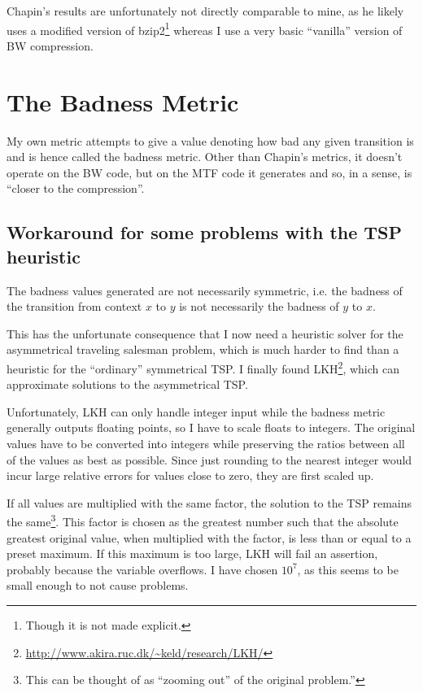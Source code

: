 \documentclass[a4paper]{scrreprt}
\begin{document}
Chapin's results are unfortunately not directly comparable to mine, as he likely
uses a modified version of bzip2\footnote{Though it is not made explicit.}
whereas I use a very basic ``vanilla'' version of BW compression.

\section{The Badness Metric}

My own metric attempts to give a value denoting how bad any given transition is
and is hence called the badness metric. Other than Chapin's metrics, it doesn't
operate on the BW code, but on the MTF code it generates and so, in a sense, is
``closer to the compression''.

\subsection{Workaround for some problems with the TSP heuristic}

The badness values generated are not necessarily symmetric, i.e. the badness of
the transition from context \(x\) to \(y\) is not necessarily the badness of
\(y\) to \(x\).

This has the unfortunate consequence that I now need a heuristic solver for the
asymmetrical traveling salesman problem, which is much harder to find than a
heuristic for the ``ordinary'' symmetrical TSP. I finally found
LKH\cite{helsgaun2000lkh}\footnote{\url{http://www.akira.ruc.dk/~keld/research/LKH/}},
which can approximate solutions to the asymmetrical TSP.

Unfortunately, LKH can only handle integer input while the badness metric
generally outputs floating points, so I have to scale floats to integers. The
original values have to be converted into integers while preserving the ratios
between all of the values as best as possible. Since just rounding to the
nearest integer would incur large relative errors for values close to zero, they
are first scaled up.

If all values are multiplied with the same factor, the solution to the TSP
remains the same\footnote{This can be thought of as ``zooming out'' of the
original problem.''}.
This factor is chosen as the greatest number such that the absolute greatest
original value, when multiplied with the factor, is less than or equal to a
preset maximum. If this maximum is too large, LKH will fail an assertion,
probably because the variable overflows. I have chosen \(10^7\), as this seems
to be small enough to not cause problems.
\end{document}
